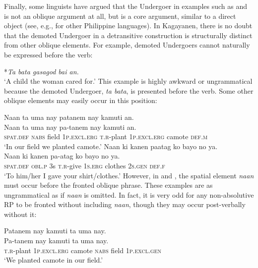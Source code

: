 Finally, some linguists have argued that the Undergoer in examples such as  and  is not an oblique argument at all, but is a core argument, similar to a direct object (see, e.g., \citealt{kroeger1993, foley2008} for other Philippine languages). In Kagayanen, there is no doubt that the demoted Undergoer in a detransitive construction is structurally distinct from other oblique elements. For example, demoted Undergoers cannot naturally be expressed before the verb:

\ea
\label{bkm:Ref497135886}
*\textit{Ta bata gasagod bai an.} \\  
‘A child the woman cared for.’
\z
This example is highly awkward or ungrammatical because the demoted Undergoer, \textit{ta bata}, is presented before the verb. Some other oblique elements may easily occur in this position:

\ea
\label{bkm:Ref497135842}
Naan  ta  uma  nay  patanem  nay  kamuti  an. \\\smallskip
\gll Naan  ta  uma  nay  pa-tanem  nay  kamuti  an. \\
\textsc{spat.def}  \textsc{nabs}  field  1\textsc{p.excl.erg}  \textsc{t.r}-plant  1\textsc{p.excl.erg}  camote  \textsc{def.m} \\
\glt ‘In our field we planted camote.’
\z
\ea
\label{bkm:Ref497135845}
Naan  ki  kanen  paatag  ko  bayo  no  ya. \\\smallskip
\gll Naan  ki  kanen  pa-atag  ko  bayo  no  ya. \\
\textsc{spat.def}  \textsc{obl.p}  3s \textsc{t.r}-give  1\textsc{s.erg}  clothes  2\textsc{s.gen}  \textsc{def.f} \\
\glt ‘To him/her I gave your shirt/clothes.’
\z
However, in  and , the spatial element \textit{naan} must occur before the fronted oblique phrase. These examples are as ungrammatical as  if \textit{naan} is omitted. In fact, it is very odd for any non-absolutive RP to be fronted without including \textit{naan}, though they may occur post-verbally without it:

\ea
Patanem  nay  kamuti  ta  uma  nay. \\\smallskip
\gll Pa-tanem  nay  kamuti  ta  uma  nay. \\
\textsc{t.r}-plant  1\textsc{p.excl.erg}  camote  \textsc{nabs}  field  1\textsc{p.excl.gen} \\
\glt ‘We planted camote in our field.’ \\\smallskip


